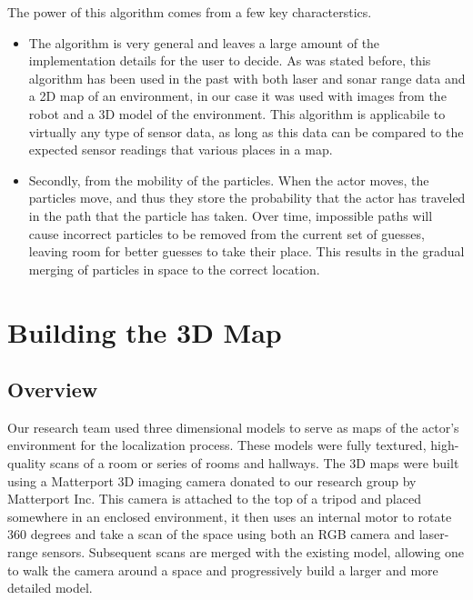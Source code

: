 \documentclass[a4paper,11pt]{article}
\begin{document}
 The power of this algorithm comes from a few key characterstics. 
\begin{itemize}
 \item The algorithm is very general and leaves a large amount of the implementation details for the user to decide. As was stated before, this algorithm has been used in the past with both laser and sonar range data and a 2D map of an environment, in our case it was used with images from the robot and a 3D model of the environment. This algorithm is applicabile to virtually any type of sensor data, as long as this data can be compared to the expected sensor readings that various places in a map. 
 \item Secondly, from the mobility of the particles. When the actor moves, the particles move, and thus they store the probability that the actor has traveled in the path that the particle has taken. Over time, impossible paths will cause incorrect particles to be removed from the current set of guesses, leaving room for better guesses to take their place. This results in the gradual merging of particles in space to the correct location.
\end{itemize}

\newpage














  \section{Building the 3D Map}
   \subsection{Overview}
  Our research team used three dimensional models to serve as maps of the actor's environment for the localization process. These models were fully textured, high-quality scans of a room or series of rooms and hallways. The 3D maps were built using a Matterport 3D imaging camera donated to our research group by Matterport Inc. This camera is attached to the top of a tripod and placed somewhere in an enclosed environment, it then uses an internal motor to rotate 360 degrees and take a scan of the space using both an RGB camera and laser-range sensors. Subsequent scans are merged with the existing model, allowing one to walk the camera around a space and progressively build a larger and more detailed model.
\end{document}

